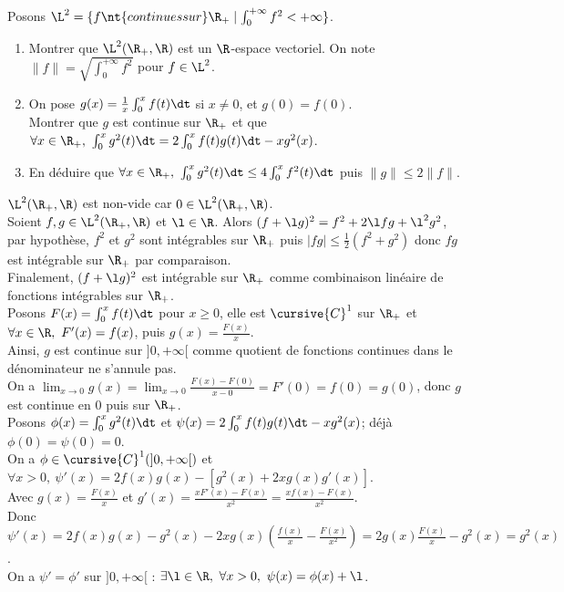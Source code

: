 \documentclass[11pt]{article}
\begin{document}
\begin{ex}{}{}
    Posons $\L^2=\{f \nt{ continues sur } \R_+ \mid \int_0^{+\infty}f^2<+\infty\}$.
    \begin{enumerate}
        \item Montrer que $\L^2(\R_+,\R)$ est un $\R$-espace vectoriel. On note $\|f\|=\sqrt{\int_0^{+\infty}f^2}$ pour $f\in\L^2$.
        \item On pose $g(x)=\frac{1}{x}\int_0^xf(t)\dt$ si $x\neq 0$, et $g(0)=f(0)$.\\
        Montrer que $g$ est continue sur $\R_+$ et que $\forall x \in \R_+, ~ \int_0^xg^2(t)\dt=2\int_0^xf(t)g(t)\dt-xg^2(x)$.
        \item En déduire que $\forall x \in \R_+, ~ \int_0^xg^2(t)\dt\leq4\int_0^xf^2(t)\dt$ puis $\|g\|\leq2\|f\|$.
    \end{enumerate}
    \tcblower
     $\L^2(\R_+,\R)$ est non-vide car $0\in\L^2(\R_+,\R)$.\\
    Soient $f,g\in\L^2(\R_+,\R)$ et $\l\in\R$. Alors $(f+\l g)^2=f^2+2\l fg + \l^2g^2$, par hypothèse, $f^2$ et $g^2$ sont intégrables sur $\R_+$ puis $|fg|\leq\frac{1}{2}(f^2+g^2)$ donc $fg$ est intégrable sur $\R_+$ par comparaison.\\
    Finalement, $(f+\l g)^2$ est intégrable sur $\R_+$ comme combinaison linéaire de fonctions intégrables sur $\R_+$.\\
     Posons $F(x)=\int_0^xf(t)\dt$ pour $x\geq0$, elle est $\cursive{C}^1$ sur $\R_+$ et $\forall x \in \R, ~ F'(x)=f(x)$, puis $g(x)=\frac{F(x)}{x}$.\\
    Ainsi, $g$ est continue sur $]0,+\infty[$ comme quotient de fonctions continues dans le dénominateur ne s'annule pas.\\
    On a $\lim_{x\to 0}g(x)=\lim_{x\to0}\frac{F(x)-F(0)}{x-0}=F'(0)=f(0)=g(0)$, donc $g$ est continue en 0 puis sur $\R_+$.\\
    Posons $\phi(x)=\int_0^xg^2(t)\dt$ et $\psi(x)=2\int_0^xf(t)g(t)\dt-xg^2(x)$; déjà $\phi(0)=\psi(0)=0$.\\
    On a $\phi\in\cursive{C}^1(]0,+\infty[)$ et $\forall x > 0, ~ \psi'(x)=2f(x)g(x)-[g^2(x)+2xg(x)g'(x)]$.\\
    Avec $g(x)=\frac{F(x)}{x}$ et $g'(x)=\frac{xF'(x)-F(x)}{x^2}=\frac{xf(x)-F(x)}{x^2}$.\\
    Donc $\psi'(x)=2f(x)g(x)-g^2(x)-2xg(x)\left( \frac{f(x)}{x} - \frac{F(x)}{x^2} \right)=2g(x)\frac{F(x)}{x}-g^2(x)=g^2(x)$.\\
    On a $\psi'=\phi'$ sur $]0,+\infty[$ : $\exists \l \in \R, ~ \forall x > 0, ~ \psi(x)=\phi(x)+\l$.\\

\end{ex}
\end{document}

